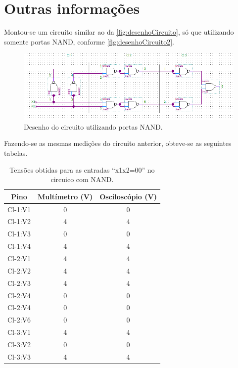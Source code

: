 \chapter{Outras informações}
	Montou-se um circuito similar ao da \autoref{fig:desenhoCircuito}, só que utilizando
	somente portas NAND, conforme \autoref{fig:desenhoCircuito2}.

	\begin{figure}[H]
		\centering
		\caption{\label{fig:desenhoCircuito2}Desenho do circuito utilizando portas NAND.}
		\includegraphics[width=1\textwidth]{img/DesenhoCircuito2.png}
	\end{figure}

	Fazendo-se as mesmas medições do circuito anterior, obteve-se as seguintes tabelas.

	\begin{table}[H]
	   \centering
	   \caption{Tensões obtidas para as entradas “x1x2=00” no circuico com NAND.}
	   \label{table:tabelaVerdade20}
	   \begin{tabular}{c|c|c}
		   \textbf{Pino} & \textbf{Multímetro (V)} & \textbf{Osciloscópio (V)}\\
		   \hline
		   Cl-1:V1 & 0 & 0 \\
		   Cl-1:V2 & 4 & 4 \\
		   Cl-1:V3 & 0 & 0 \\
		   Cl-1:V4 & 4 & 4 \\
		   \hline
		   Cl-2:V1 & 4 & 4 \\
		   Cl-2:V2 & 4 & 4 \\
		   Cl-2:V3 & 4 & 4 \\
		   Cl-2:V4 & 0 & 0 \\
		   Cl-2:V4 & 0 & 0 \\
		   Cl-2:V6 & 0 & 0 \\
		   \hline
		   Cl-3:V1 & 4 & 4 \\
		   Cl-3:V2 & 0 & 0 \\
		   Cl-3:V3 & 4 & 4 \\
	   \end{tabular}
   \end{table}

